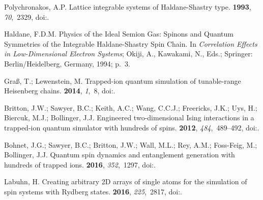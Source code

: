 \documentclass[preprints,article,accept,moreauthors,pdftex]{Definitions/mdpi}
\begin{document}
\begin{thebibliography}{999}
Polychronakos, A.P.
\newblock Lattice integrable systems of {H}aldane-{S}hastry type.
 {\bf 1993}, {\em 70},~2329,
\linebreak
  doi:{\href{https://doi.org/10.1103/PhysRevLett.70.2329}{}}.

Haldane, F.D.M.
\newblock Physics of the Ideal Semion Gas: Spinons and Quantum Symmetries of
  the Integrable {H}aldane-{S}hastry Spin Chain.
\newblock In \emph{Correlation Effects in Low-Dimensional Electron Systems}; Okiji, A.,
  Kawakami, N., Eds.; Springer: Berlin/Heidelberg, Germany, 1994;
  p.~3.

Gra{\ss}, T.; Lewenstein, M.
\newblock Trapped-ion quantum simulation of tunable-range {H}eisenberg chains.
 {\bf 2014}, {\em 1},~8,
\newblock
  doi:{\href{https://doi.org/10.1140/epjqt8}{}}.

Britton, J.W.; Sawyer, B.C.; Keith, A.C.; Wang, C.C.J.; Freericks, J.K.; Uys,
  H.; Biercuk, M.J.; Bollinger, J.J.
\newblock Engineered two-dimensional {I}sing interactions in a trapped-ion
  quantum simulator with hundreds of spins.
 {\bf 2012}, {\em 484},~489--492,
\newblock
  doi:{\href{https://doi.org/10.1038/nature10981}{}}.

Bohnet, J.G.; Sawyer, B.C.; Britton, J.W.; Wall, M.L.; Rey, A.M.; Foss-Feig,
  M.; Bollinger, J.J.
\newblock Quantum spin dynamics and entanglement generation with hundreds of
  trapped ions.
 {\bf 2016}, {\em 352},~1297,
\newblock
  doi:{\href{https://doi.org/10.1126/science.aad9958}{}}.

Labuhn, H.
\newblock Creating arbitrary {2D} arrays of single atoms for the simulation of
  spin systems with {R}ydberg states.
 {\bf 2016}, {\em 225},~2817,
\newblock
  doi:{\href{https://doi.org/10.1140/epjst/e2015-50336-5}{}}.


\end{thebibliography}
\end{document}
